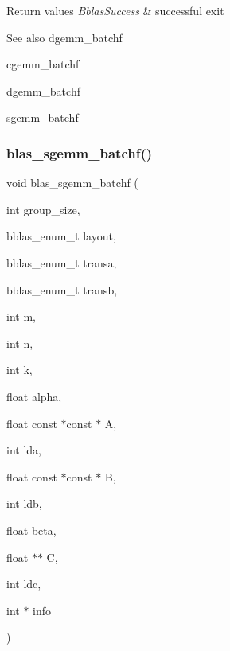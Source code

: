 \begin{DoxyRetVals}{Return values}
{\em Bblas\+Success} & successful exit\\
\hline
\end{DoxyRetVals}
\begin{DoxySeeAlso}{See also}
dgemm\+\_\+batchf 

cgemm\+\_\+batchf 

dgemm\+\_\+batchf 

sgemm\+\_\+batchf 
\end{DoxySeeAlso}
\mbox{\label{group__gemm__batchf_ga5b47cbf645948cf526faafecdd56ff35}} 
\subsubsection{\texorpdfstring{blas\+\_\+sgemm\+\_\+batchf()}{blas\_sgemm\_batchf()}}
{\footnotesize\ttfamily void blas\+\_\+sgemm\+\_\+batchf (\begin{DoxyParamCaption}\item[{int}]{group\+\_\+size,  }\item[{bblas\+\_\+enum\+\_\+t}]{layout,  }\item[{bblas\+\_\+enum\+\_\+t}]{transa,  }\item[{bblas\+\_\+enum\+\_\+t}]{transb,  }\item[{int}]{m,  }\item[{int}]{n,  }\item[{int}]{k,  }\item[{float}]{alpha,  }\item[{float const $\ast$const $\ast$}]{A,  }\item[{int}]{lda,  }\item[{float const $\ast$const $\ast$}]{B,  }\item[{int}]{ldb,  }\item[{float}]{beta,  }\item[{float $\ast$$\ast$}]{C,  }\item[{int}]{ldc,  }\item[{int $\ast$}]{info }\end{DoxyParamCaption})}

